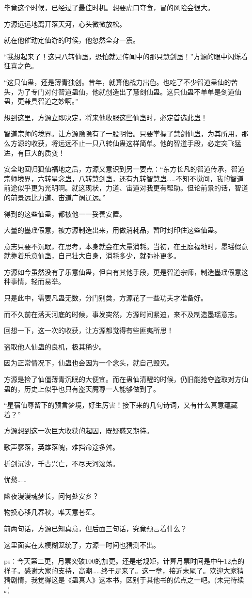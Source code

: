 \begin{this_body}
毕竟这个时候，已经过了最佳时机。想要虎口夺食，冒的风险会很大。

方源远远地离开落天河，心头微微放松。

就在他催动定仙游的时候，他忽然全身一震。

“我想起来了！这只八转仙蛊，恐怕就是传闻中的那只慧剑蛊！”方源的眼中闪烁着狂喜之色。

“这只仙蛊，还是薄青独创。昔年，就算他战力出色。也吃了不少智道蛊仙的苦头，为了专门对付智道蛊仙，他就创造出了慧剑仙蛊。这只仙蛊不单单是剑道仙蛊，更兼具智道之妙啊。”

想到这里，方源立即决定，将来他收服这些仙蛊时，必定首选此蛊！

智道宗师的境界。让方源隐隐有了一股明悟。只要掌握了慧剑仙蛊，为其所用，那么方源的收获，将远远不止一只八转仙蛊这样简单。他的智道手段，必定突飞猛进，有巨大的质变！

安全地回归狐仙福地之后，方源又意识到另一要点：“东方长凡的智道传承，智道宗师境界，六转星念蛊，八转慧剑蛊，还有九转智慧蛊……不知不觉间，我的智道前途似乎更为光明啊。就这现状，力道、宙道对我更有帮助。但论前景的话，智道的前景远比力道、宙道广阔辽远。”

得到的这些仙蛊，都被他一一妥善安置。

大量的墨瑶假意，被方源制造出来，用做消耗品，暂时封印住这些仙蛊。

意志只要不沉眠，在思考，本身就会在大量消耗。当初，在王庭福地时，墨瑶假意就靠着乐意仙蛊，自己壮大自身，消耗多少，就弥补更多。

方源如今虽然没有了乐意仙蛊，但自有其他手段，更是智道宗师，制造墨瑶假意这种事情，轻而易举。

只是此中，需要凡蛊无数，分门别类，方源花了一些功夫才准备好。

而不久前在落天河底的时候，事发突然，方源时间紧迫，来不及制造墨瑶意志。

回想一下，这一次的收获，让方源都觉得有些匪夷所思！

盗取他人仙蛊的良机，极其稀少。

因为正常情况下，仙蛊也会因为一个念头，就自己毁灭。

方源是捡了仙僵薄青沉眠的大便宜。而在蛊仙清醒的时候，仍旧能抢夺盗取对方仙蛊的，历史上似乎也只有盗天魔尊一人能够做到了。

“星宿仙尊留下的预言梦境，好生厉害！接下来的几句诗词，又有什么真意蕴藏着？”

方源想到这一次巨大收获的起因，既疑惑又期待。

歌声寥落，英雄落魄，难挡命途多舛。

折剑沉沙，千古兴亡，不尽天河滚荡。

忧愁……

幽夜漫漫魂梦长，问何处安乡？

物换心移几春秋，唯天意苍茫。

前两句话，方源已知真意，但后面三句话，究竟预言着什么？

这里面实在太模糊笼统了，方源一时间也猜测不出。

ps：今天第二更，月票突破100的加更。还是老规矩，计算月票时间是中午12点的样子。感谢大家的支持，高潮……终于是来了。这一章，接近末尾了。欢迎大家猜猜剧情，我觉得这是《蛊真人》这本书，区别于其他书的优点之一吧。(未完待续 。)

\end{this_body}

